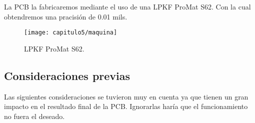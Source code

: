 La PCB la fabricaremos mediante el uso de una LPKF ProMat S62. Con la cual obtendremos una pracisión de 0.01 mils.

\hfill
\begin{figure}[H]%
\noindent \begin{centering}
\texttt{[image: capitulo5/maquina]}
\par\end{centering}
\caption{\label{fig:maquina} LPKF ProMat S62.}
\end{figure}
\smallskip


\subsection{Consideraciones previas}
Las siguientes consideraciones se tuvieron muy en cuenta ya que tienen un gran impacto en el resultado final de la \acrshort{PCB}. Ignorarlas haría que el funcionamiento no fuera el deseado.

